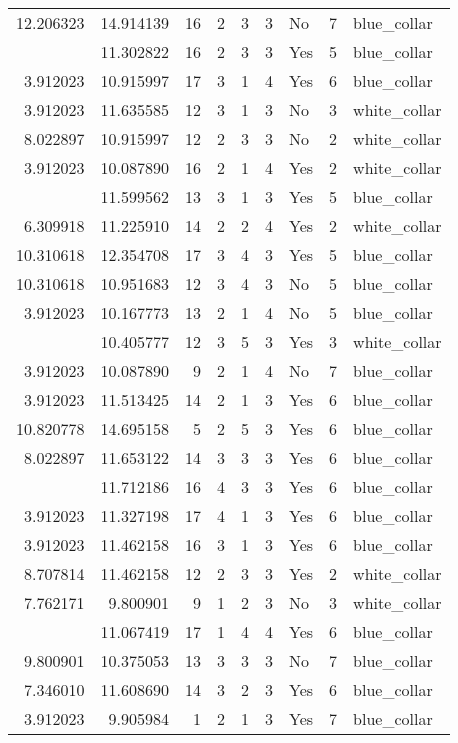 \documentclass[
]{article}
\begin{document}
\begin{longtable}[t]{rrrrrllrl}
12.206323 & 14.914139 & 16 & 2 & 3 & 3 & No & 7 & blue\_collar\\
\addlinespace
10.310618 & 11.302822 & 16 & 2 & 3 & 3 & Yes & 5 & blue\_collar\\
3.912023 & 10.915997 & 17 & 3 & 1 & 4 & Yes & 6 & blue\_collar\\
3.912023 & 11.635585 & 12 & 3 & 1 & 3 & No & 3 & white\_collar\\
8.022897 & 10.915997 & 12 & 2 & 3 & 3 & No & 2 & white\_collar\\
3.912023 & 10.087890 & 16 & 2 & 1 & 4 & Yes & 2 & white\_collar\\
\addlinespace
3.912023 & 11.599562 & 13 & 3 & 1 & 3 & Yes & 5 & blue\_collar\\
6.309918 & 11.225910 & 14 & 2 & 2 & 4 & Yes & 2 & white\_collar\\
10.310618 & 12.354708 & 17 & 3 & 4 & 3 & Yes & 5 & blue\_collar\\
10.310618 & 10.951683 & 12 & 3 & 4 & 3 & No & 5 & blue\_collar\\
3.912023 & 10.167773 & 13 & 2 & 1 & 4 & No & 5 & blue\_collar\\
\addlinespace
8.507143 & 10.405777 & 12 & 3 & 5 & 3 & Yes & 3 & white\_collar\\
3.912023 & 10.087890 & 9 & 2 & 1 & 4 & No & 7 & blue\_collar\\
3.912023 & 11.513425 & 14 & 2 & 1 & 3 & Yes & 6 & blue\_collar\\
10.820778 & 14.695158 & 5 & 2 & 5 & 3 & Yes & 6 & blue\_collar\\
8.022897 & 11.653122 & 14 & 3 & 3 & 3 & Yes & 6 & blue\_collar\\
\addlinespace
10.001068 & 11.712186 & 16 & 4 & 3 & 3 & Yes & 6 & blue\_collar\\
3.912023 & 11.327198 & 17 & 4 & 1 & 3 & Yes & 6 & blue\_collar\\
3.912023 & 11.462158 & 16 & 3 & 1 & 3 & Yes & 6 & blue\_collar\\
8.707814 & 11.462158 & 12 & 2 & 3 & 3 & Yes & 2 & white\_collar\\
7.762171 & 9.800901 & 9 & 1 & 2 & 3 & No & 3 & white\_collar\\
\addlinespace
7.955074 & 11.067419 & 17 & 1 & 4 & 4 & Yes & 6 & blue\_collar\\
9.800901 & 10.375053 & 13 & 3 & 3 & 3 & No & 7 & blue\_collar\\
7.346010 & 11.608690 & 14 & 3 & 2 & 3 & Yes & 6 & blue\_collar\\
3.912023 & 9.905984 & 1 & 2 & 1 & 3 & Yes & 7 & blue\_collar\\

\end{longtable}
\end{document}
